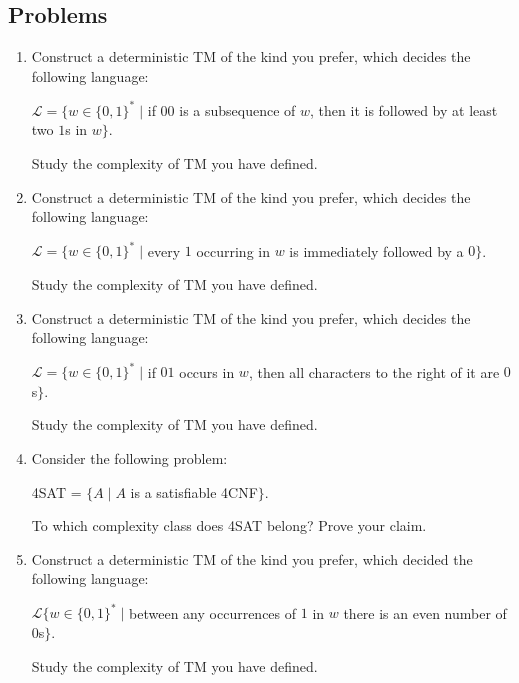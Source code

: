 \documentclass{article}
\begin{document}
		\subsection{Problems}
			\begin{enumerate}[label=\textbf{\arabic*.}, leftmargin=*]
				\item Construct a deterministic TM of the kind you prefer, which decides the following language:
				\begin{center}
					$\mathcal{L} = \{w \in \{0,1\}^*\; \vert$ if $00$ is a subsequence of $w$, then it is followed by at least two $1$s in $w\}$.
				\end{center}
				Study the complexity of TM you have defined.
				\begin{pane}
						
				\end{pane}
				\item Construct a deterministic TM of the kind you prefer, which decides the following language:
				\begin{center}
					$\mathcal{L} = \{w \in \{0,1\}^*\; \vert$ every $1$ occurring in $w$ is immediately followed by a $0\}$.
				\end{center}
				Study the complexity of TM you have defined.
				\begin{pane}
						
				\end{pane}
				\item Construct a deterministic TM of the kind you prefer, which decides the following language:
				\begin{center}
					$\mathcal{L} = \{w \in \{0,1\}^*\; \vert$ if $01$ occurs in $w$, then all characters to the right of it are $0$s$\}$.
				\end{center}
				Study the complexity of TM you have defined.
				\begin{pane}
						
				\end{pane}
				\item Consider the following problem:
				\begin{center}
					4SAT = $\{A \; \vert \; A$ is a satisfiable 4CNF$\}$.
				\end{center}
				To which complexity class does 4SAT belong? Prove your claim.
				\begin{pane}
						
				\end{pane}
				\item Construct a deterministic TM of the kind you prefer, which decided the following language:
				\begin{center}
					$\mathcal{L}\{w \in \{0,1\}^* \; \vert$ between any occurrences of $1$ in $w$ there is an even number of $0$s$\}$.
				\end{center}
				Study the complexity of TM you have defined.
				\begin{pane}
						

\end{pane}
\end{enumerate}
\end{document}
